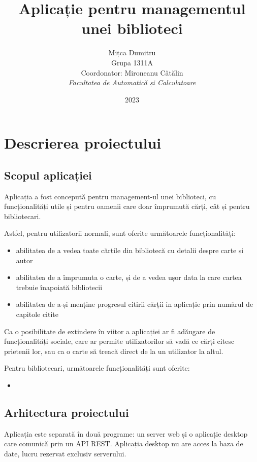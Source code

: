 \documentclass{article}
\title{Aplicație pentru managementul unei biblioteci}
\author{
    Mițca Dumitru\\
    Grupa 1311A\\
    Coordonator: Mironeanu Cătălin\\
    \emph{Facultatea de Automatică și Calculatoare}
}
\date{2023}
\begin{document}
    \maketitle
    \hypersetup{linkbordercolor=1 1 1}
    \renewcommand*\contentsname{Cuprins}
    \tableofcontents
    \hypersetup{linkbordercolor=1 0 0}

    \newpage

    \section{Descrierea proiectului}

    \subsection{Scopul aplicației}

    Aplicația a fost concepută pentru management-ul unei biblioteci, cu funcționalități utile și pentru
    oamenii care doar împrumută cărți, cât și pentru bibliotecari.

    Astfel, pentru utilizatorii normali, sunt oferite următoarele funcționalități:
    \begin{itemize}
        \item abilitatea de a vedea toate cărțile din bibliotecă cu detalii despre carte și autor
        \item abilitatea de a împrumuta o carte, și de a vedea ușor data la care cartea trebuie înapoiată bibliotecii
        \item abilitatea de a-și menține progresul citirii cărții in aplicație prin numărul de capitole citite
    \end{itemize}
    Ca o posibilitate de extindere în viitor a aplicației ar fi adăugare de funcționalități sociale, care ar permite
    utilizatorilor să vadă ce cărți citesc prietenii lor, sau ca o carte să treacă direct de la un utilizator
    la altul.

    Pentru bibliotecari, următoarele funcționalități sunt oferite:
    \begin{itemize}
        \item
    \end{itemize}

    \subsection{Arhitectura proiectului}

    Aplicația este separată în două programe: un server web și o aplicație desktop care comunică
    prin un API REST. Aplicația desktop nu are acces la baza de date, lucru rezervat exclusiv
    serverului.
\end{document}
